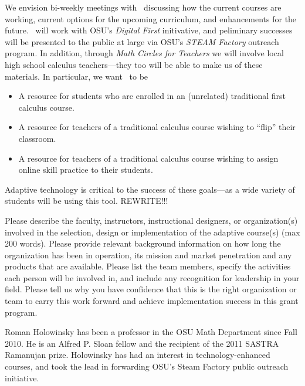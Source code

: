 

We envision bi-weekly meetings with \gratisu\ discussing how the
current courses are working, current options for the upcoming
curriculum, and enhancements for the future. \gratisu\ will work with
OSU's \textsl{Digital First} initivative, and peliminary successes
will be presented to the public at large via OSU's \textsl{STEAM
  Factory} outreach program. In addition, through \textsl{Math Circles
  for Teachers} we will involve local high school calculus
teachers---they too will be able to make us of these materials.  In
particular, we want \mooculus\ to be
\begin{itemize}
\item A resource for students who are enrolled in an (unrelated)
  traditional first calculus course.
\item A resource for teachers of a traditional calculus course wishing
  to ``flip'' their classroom.
\item A resource for teachers of a traditional calculus course wishing to assign
online skill practice to their students.
\end{itemize}
Adaptive technology is critical to the success of these goals---as a
wide variety of students will be using this tool. REWRITE!!!







\begin{question}
Please describe the faculty, instructors, instructional
designers, or organization(s) involved in the selection, design or
implementation of the adaptive course(s) (max 200 words). Please
provide relevant background information on how long the organization
has been in operation, its mission and market penetration and any
products that are available. Please list the team members, specify
the activities each person will be involved in, and include any
recognition for leadership in your field. Please tell us why you
have confidence that this is the right organization or team to carry
this work forward and achieve implementation success in this grant
program.
\end{question}

Roman Holowinsky has been a professor in the OSU Math Department since
Fall 2010. He is an Alfred P. Sloan fellow and the recipient of the
2011 SASTRA Ramanujan prize. Holowinsky has had an interest in
technology-enhanced courses, and took the lead in forwarding OSU's
Steam Factory public outreach initiative.

